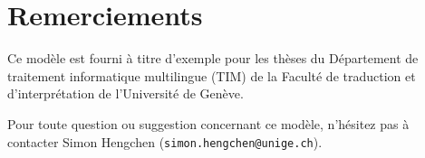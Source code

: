 \chapter*{Remerciements}

Ce modèle est fourni à titre d'exemple pour les thèses du Département
de traitement informatique multilingue (TIM) de la Faculté de
traduction et d'interprétation de l'Université de Genève.

Pour toute question ou suggestion concernant ce modèle, n'hésitez pas à contacter Simon Hengchen (\texttt{simon.hengchen@unige.ch}).